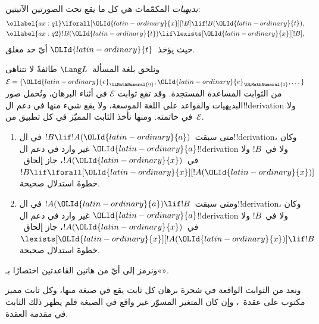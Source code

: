 \documentclass[../../../include/open-logic-section]{subfiles}
\begin{document}


\begin{defn}
\emph{بديهيات} المكمّمات هي كل ما يقع تحت الصورتين الآتيتين:
\begin{align}
\ollabel{ax:q1} & \lforall[{\OLId{latin-ordinary}{x}}][!B] \lif !B({\OLId{latin-ordinary}{t}}), \\
\ollabel{ax:q2} & !B({\OLId{latin-ordinary}{t}}) \lif \lexists[{\OLId{latin-ordinary}{x}}][!B],
\end{align}
حيث يؤخذ~${\OLId{latin-ordinary}{t}}$ أيّ حد مغلق.
\end{defn}

ونلحق بلغة المسألة~$\Lang L$ طائفةً لا تتناهى
$\mathcal E=\{{\OLId{latin-ordinary}{e}}_{\OLMathNumeral{0}},{\OLId{latin-ordinary}{e}}_{\OLMathNumeral{1}},\dots\}$ من الثوابت المساعدة المستجدة. وقد تقع ثوابت
$\mathcal E$ في أثناء البرهان، وتُحمل صور البديهيات والقواعد على اللغة
الموسعة، ولا يقع شيء منها في دعم ال!!{derivation} ولا في خاتمته. ومنها
نأخذ الثابت المميّز في كل تطبيق من~$\mathcal E$.

\begin{defn}[قواعد المكمّمات]
\begin{enumerate}
\item متى سبقت~$!B \lif !A({\OLId{latin-ordinary}{a}})$ في ال!!{derivation}، وكان
  ${\OLId{latin-ordinary}{a}}$ غير وارد في دعم ال!!{derivation} ولا في~$!B$ ولا في~$!A({\OLId{latin-ordinary}{x}})$، جاز إلحاق~$!B \lif
  \lforall[{\OLId{latin-ordinary}{x}}][!A({\OLId{latin-ordinary}{x}})]$ خطوةَ استدلال صحيحة.
\item ومتى سبقت~$!A({\OLId{latin-ordinary}{a}}) \lif !B$ في ال!!{derivation}، وكان
  ${\OLId{latin-ordinary}{a}}$ غير وارد في دعم ال!!{derivation} ولا في~$!B$ ولا في~$!A({\OLId{latin-ordinary}{x}})$، جاز إلحاق~$\lexists[{\OLId{latin-ordinary}{x}}][!A({\OLId{latin-ordinary}{x}})] \lif
  !B$ خطوةَ استدلال صحيحة.
\end{enumerate}
\end{defn}

ونرمز إلى أيّ من هاتين القاعدتين اختصارًا بـ«\QR».

ونعد من الثوابت الواقعة في شجرة برهان كل ثابت يقع في صيغة منها، وكل ثابت
مميز مكتوب على عقدة~\QR{}، وإن كان المتغير المسوّر غير واقع في الصيغة فلم
يظهر ذلك الثابت في مقدمة العقدة.
\end{document}
